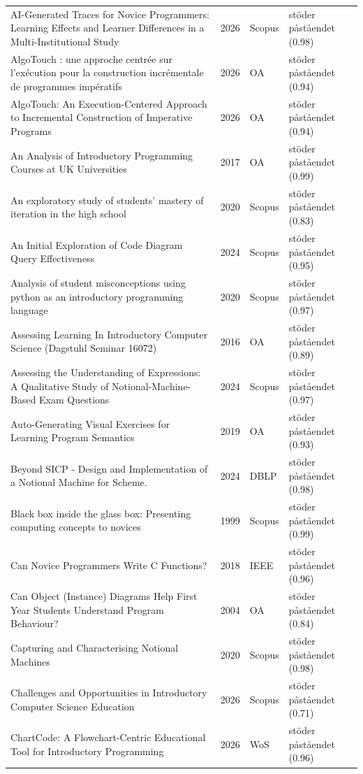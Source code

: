 \begin{longtable}{@{}%
  >{\raggedright\arraybackslash}p{}c%
  >{\raggedright\arraybackslash}p{}%
  >{\raggedright\arraybackslash}p{}@{}}
AI-Generated Traces for Novice Programmers: Learning Effects and Learner Differences in a Multi-Institutional Study & 2026 & Scopus & stöder påståendet (0.98) \\
AlgoTouch : une approche centrée sur l'exécution pour la construction incrémentale de programmes impératifs & 2026 & OA & stöder påståendet (0.94) \\
AlgoTouch: An Execution-Centered Approach to Incremental Construction of Imperative Programs & 2026 & OA & stöder påståendet (0.94) \\
An Analysis of Introductory Programming Courses at UK Universities & 2017 & OA & stöder påståendet (0.99) \\
An exploratory study of students' mastery of iteration in the high school & 2020 & Scopus & stöder påståendet (0.83) \\
An Initial Exploration of Code Diagram Query Effectiveness & 2024 & Scopus & stöder påståendet (0.95) \\
Analysis of student misconceptions using python as an introductory programming language & 2020 & Scopus & stöder påståendet (0.97) \\
Assessing Learning In Introductory Computer Science (Dagstuhl Seminar 16072) & 2016 & OA & stöder påståendet (0.89) \\
Assessing the Understanding of Expressions: A Qualitative Study of Notional-Machine-Based Exam Questions & 2024 & Scopus & stöder påståendet (0.97) \\
Auto-Generating Visual Exercises for Learning Program Semantics & 2019 & OA & stöder påståendet (0.93) \\
Beyond SICP - Design and Implementation of a Notional Machine for Scheme. & 2024 & DBLP & stöder påståendet (0.98) \\
Black box inside the glass box: Presenting computing concepts to novices & 1999 & Scopus & stöder påståendet (0.99) \\
Can Novice Programmers Write C Functions? & 2018 & IEEE & stöder påståendet (0.96) \\
Can Object (Instance) Diagrams Help First Year Students Understand Program Behaviour? & 2004 & OA & stöder påståendet (0.84) \\
Capturing and Characterising Notional Machines & 2020 & Scopus & stöder påståendet (0.98) \\
Challenges and Opportunities in Introductory Computer Science Education & 2026 & Scopus & stöder påståendet (0.71) \\
ChartCode: A Flowchart-Centric Educational Tool for Introductory Programming & 2026 & WoS & stöder påståendet (0.96) \\

\end{longtable}
